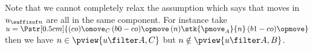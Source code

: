 Note that we cannot completely relax the assumption 
which says that moves in $u_{\suffixof n}$ are all in the same component.
For instance take $u = \Pstr[0.5cm]{(co){\omove_C}\thinspace 
(b0-co){\opmove} \thinspace 
(n){\stk{\pmove_A}{n}} \thinspace 
(b1-co){\opmove}}$ then we have $n\in\pview{u\filter A,C}$ but $n\notin\pview{u\filter A,B}$.


%
%


